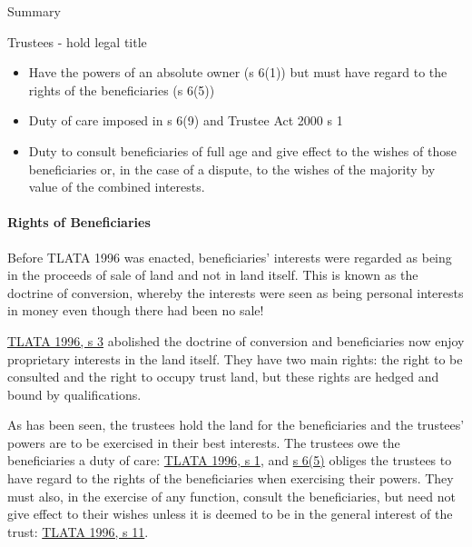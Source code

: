 \documentclass[
]{article}
\providecommand{\tightlist}{%
  \setlength{\itemsep}{0pt}\setlength{\parskip}{0pt}}
\newenvironment{env-d6ce83a0-f7a8-46b6-be95-b1235f1feb63}
{
    \savenotes\tcolorbox[blanker,breakable,left=5pt,borderline west={2pt}{-4pt}{gray}]
}
{
    \endtcolorbox\spewnotes
}
\begin{document}
\begin{env-d6ce83a0-f7a8-46b6-be95-b1235f1feb63}

Summary

Trustees - hold legal title

\begin{itemize}
\tightlist
\item
  Have the powers of an absolute owner (s 6(1)) but must have regard to
  the rights of the beneficiaries (s 6(5))
\item
  Duty of care imposed in s 6(9) and Trustee Act 2000 s 1
\item
  Duty to consult beneficiaries of full age and give effect to the
  wishes of those beneficiaries or, in the case of a dispute, to the
  wishes of the majority by value of the combined interests.
\end{itemize}

\end{env-d6ce83a0-f7a8-46b6-be95-b1235f1feb63}

\hypertarget{rights-of-beneficiaries}{%
\paragraph{Rights of Beneficiaries}\label{rights-of-beneficiaries}}

Before TLATA 1996 was enacted, beneficiaries' interests were regarded as
being in the proceeds of sale of land and not in land itself. This is
known as the doctrine of conversion, whereby the interests were seen as
being personal interests in money even though there had been no sale!

\href{https://www.legislation.gov.uk/ukpga/1996/47/section/3}{TLATA
1996, s 3} abolished the doctrine of conversion and beneficiaries now
enjoy proprietary interests in the land itself. They have two main
rights: the right to be consulted and the right to occupy trust land,
but these rights are hedged and bound by qualifications.

As has been seen, the trustees hold the land for the beneficiaries and
the trustees' powers are to be exercised in their best interests. The
trustees owe the beneficiaries a duty of care:
\href{https://www.legislation.gov.uk/ukpga/1996/47/section/1}{TLATA
1996, s 1}, and
\href{https://www.legislation.gov.uk/ukpga/1996/47/section/6}{s 6(5)}
obliges the trustees to have regard to the rights of the beneficiaries
when exercising their powers. They must also, in the exercise of any
function, consult the beneficiaries, but need not give effect to their
wishes unless it is deemed to be in the general interest of the trust:
\href{https://www.legislation.gov.uk/ukpga/1996/47/section/11}{TLATA
1996, s 11}.
\end{document}
